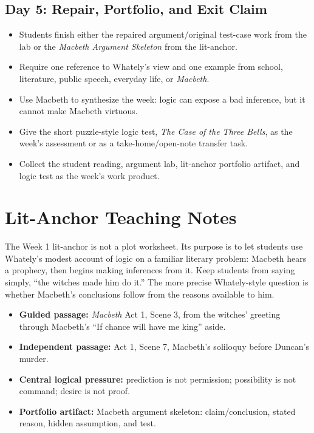 \documentclass[12pt]{article}
\begin{document}
\subsection*{Day 5: Repair, Portfolio, and Exit Claim}
\begin{itemize}[leftmargin=*]
\item Students finish either the repaired argument/original test-case work from the lab or the \textit{Macbeth Argument Skeleton} from the lit-anchor.
\item Require one reference to Whately's view and one example from school, literature, public speech, everyday life, or \textit{Macbeth}.
\item Use Macbeth to synthesize the week: logic can expose a bad inference, but it cannot make Macbeth virtuous.
\item Give the short puzzle-style logic test, \textit{The Case of the Three Bells}, as the week's assessment or as a take-home/open-note transfer task.
\item Collect the student reading, argument lab, lit-anchor portfolio artifact, and logic test as the week's work product.
\end{itemize}

\section*{Lit-Anchor Teaching Notes}
The Week 1 lit-anchor is not a plot worksheet. Its purpose is to let students use Whately's modest account of logic on a familiar literary problem: Macbeth hears a prophecy, then begins making inferences from it. Keep students from saying simply, ``the witches made him do it.'' The more precise Whately-style question is whether Macbeth's conclusions follow from the reasons available to him.

\begin{itemize}[leftmargin=*]
\item \textbf{Guided passage:} \textit{Macbeth} Act 1, Scene 3, from the witches' greeting through Macbeth's ``If chance will have me king'' aside.
\item \textbf{Independent passage:} Act 1, Scene 7, Macbeth's soliloquy before Duncan's murder.
\item \textbf{Central logical pressure:} prediction is not permission; possibility is not command; desire is not proof.
\item \textbf{Portfolio artifact:} Macbeth argument skeleton: claim/conclusion, stated reason, hidden assumption, and test.
\end{itemize}
\end{document}
